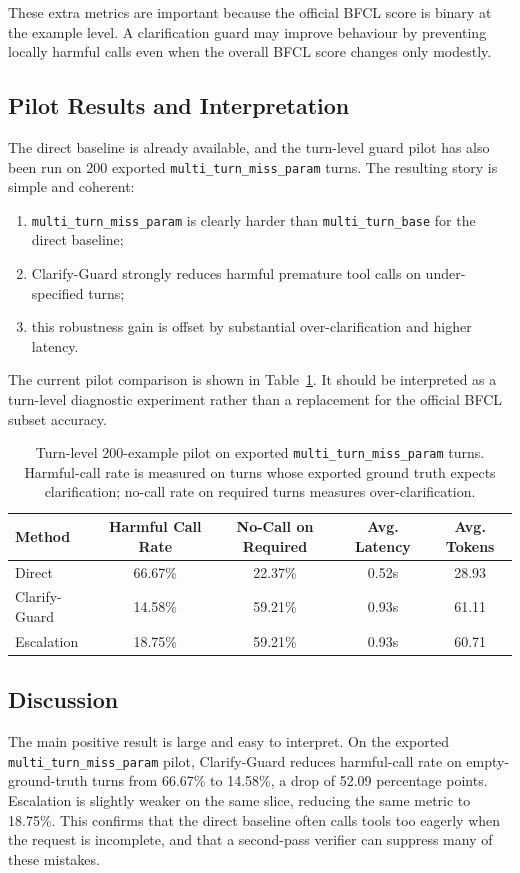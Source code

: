 \documentclass[10pt,twocolumn]{article}
\begin{document}
These extra metrics are important because the official BFCL score is binary at the example level. A clarification guard may improve behaviour by preventing locally harmful calls even when the overall BFCL score changes only modestly.

\subsection{Pilot Results and Interpretation}
The direct baseline is already available, and the turn-level guard pilot has also been run on 200 exported \texttt{multi\_turn\_miss\_param} turns. The resulting story is simple and coherent:
\begin{enumerate}
    \item \texttt{multi\_turn\_miss\_param} is clearly harder than \texttt{multi\_turn\_base} for the direct baseline;
    \item Clarify-Guard strongly reduces harmful premature tool calls on under-specified turns;
    \item this robustness gain is offset by substantial over-clarification and higher latency.
\end{enumerate}

The current pilot comparison is shown in Table~\ref{tab:main-results}. It should be interpreted as a turn-level diagnostic experiment rather than a replacement for the official BFCL subset accuracy.

\begin{table}[t]
\centering
\small
\begin{tabular}{lcccc}
\toprule
Method & Harmful Call Rate & No-Call on Required & Avg. Latency & Avg. Tokens \\
\midrule
Direct & 66.67\% & 22.37\% & 0.52s & 28.93 \\
Clarify-Guard & 14.58\% & 59.21\% & 0.93s & 61.11 \\
Escalation & 18.75\% & 59.21\% & 0.93s & 60.71 \\
\bottomrule
\end{tabular}
\caption{Turn-level 200-example pilot on exported \texttt{multi\_turn\_miss\_param} turns. Harmful-call rate is measured on turns whose exported ground truth expects clarification; no-call rate on required turns measures over-clarification.}
\label{tab:main-results}
\end{table}

\subsection{Discussion}
The main positive result is large and easy to interpret. On the exported \texttt{multi\_turn\_miss\_param} pilot, Clarify-Guard reduces harmful-call rate on empty-ground-truth turns from 66.67\% to 14.58\%, a drop of 52.09 percentage points. Escalation is slightly weaker on the same slice, reducing the same metric to 18.75\%. This confirms that the direct baseline often calls tools too eagerly when the request is incomplete, and that a second-pass verifier can suppress many of these mistakes.
\end{document}

